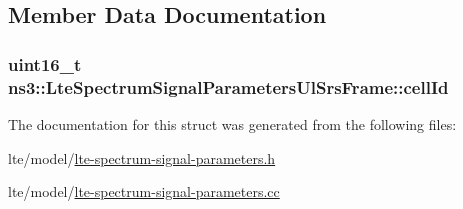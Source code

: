 \subsection{Member Data Documentation}
\subsubsection[{\texorpdfstring{cell\+Id}{cellId}}]{\setlength{\rightskip}{0pt plus 5cm}uint16\+\_\+t ns3\+::\+Lte\+Spectrum\+Signal\+Parameters\+Ul\+Srs\+Frame\+::cell\+Id}\hypertarget{structns3_1_1LteSpectrumSignalParametersUlSrsFrame_a80bb377e187bf069b612f237625222b0}{}\label{structns3_1_1LteSpectrumSignalParametersUlSrsFrame_a80bb377e187bf069b612f237625222b0}


The documentation for this struct was generated from the following files\+:\begin{DoxyCompactItemize}
\item 
lte/model/\hyperlink{lte-spectrum-signal-parameters_8h}{lte-\/spectrum-\/signal-\/parameters.\+h}\item 
lte/model/\hyperlink{lte-spectrum-signal-parameters_8cc}{lte-\/spectrum-\/signal-\/parameters.\+cc}\end{DoxyCompactItemize}

